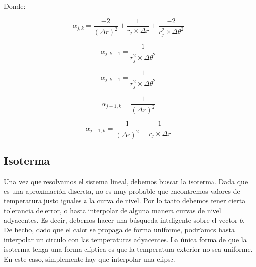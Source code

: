Donde:

\begin{equation}
\alpha_{j,k} = \frac{-2}{(\Delta r)^2} + \frac{1}{r_j \times \Delta r} + \frac{-2}{r_j^2 \times \Delta \theta^2}
\end{equation}

\begin{equation}
\alpha_{j,k+1} = \frac{1}{r_j^2 \times \Delta \theta^2}
\end{equation}

\begin{equation}
\alpha_{j,k-1} = \frac{1}{r_j^2 \times \Delta \theta^2}
\end{equation}

\begin{equation}
\alpha_{j+1,k} = \frac{1}{(\Delta r)^2}
\end{equation}

\begin{equation}
\alpha_{j-1,k} = \frac{1}{(\Delta r)^2} - \frac{1}{r_j \times \Delta r}
\end{equation}

\subsection{Isoterma}
Una vez que resolvamos el sistema lineal, debemos buscar la isoterma. Dada que es una aproximación discreta, no es muy probable que encontremos valores de temperatura justo iguales a la curva de nivel. Por lo tanto debemos tener cierta tolerancia de error, o hasta interpolar de alguna manera curvas de nivel adyacentes. Es decir, debemos hacer una búsqueda inteligente sobre el vector $b$. De hecho, dado que el calor se propaga de forma uniforme, podríamos hasta interpolar un circulo con las temperaturas adyacentes. La única forma de que la isoterma tenga una forma elíptica es que la temperatura exterior no sea uniforme. En este caso, simplemente hay que interpolar una elipse.